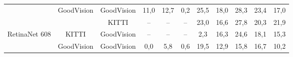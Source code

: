 \documentclass[twoside]{ctuthesis}
\theoremstyle{plain}
\theoremstyle{definition}
\theoremstyle{note}
\begin{document}
\begin{table}[hbt]
{\begin{tabular}{|c|c|c|c|c|c|c|c|c|c|c|}
                                                         & GoodVision                                                          & GoodVision                                                         & 11,0                                                                   & 12,7                                                               & 0,2                                                                       & 25,5                                                               & 18,0                                                                  & 28,3                                                                 & 23,4                                                               & 17,0                                                            \\ \cline{2-11} 
                                                         &                                                                     & KITTI                                                              & --                                                                     & --                                                                 & --                                                                        & 23,0                                                               & 16,6                                                                  & 27,8                                                                 & 20,3                                                               & 21,9                                                            \\ \cline{3-11} 
\multirow{-3}{*}{RetinaNet 608}                          & \multirow{-2}{*}{KITTI}                                             & GoodVision                                                         & --                                                                     & --                                                                 & --                                                                        & 2,3                                                                & 16,3                                                                  & 24,6                                                                 & 18,1                                                               & 15,3                                                            \\ \hline
                                                         & GoodVision                                                          & GoodVision                                                         & 0,0                                                                    & 5,8                                                                & 0,6                                                                       & 19,5                                                               & 12,9                                                                  & 15,8                                                                 & 16,7                                                               & 10,2                                                            \\ \cline{2-11} 

\end{tabular}}
\end{table}
\end{document}
